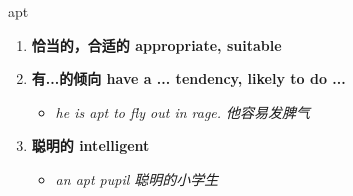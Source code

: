 
\begin{frame}
{\huge apt}
\begin{center}
\begin{enumerate}\Large
  \item \textbf{恰当的，合适的 appropriate, suitable}
  \item \textbf{有...的倾向 have a ... tendency, likely to do ...}
  \begin{itemize}
    \item \em{\Large{he is apt to fly out in rage. 他容易发脾气}}
  \end{itemize}
  \item \textbf{聪明的 intelligent}
  \begin{itemize}
    \item \em{\Large{an apt pupil 聪明的小学生}}
  \end{itemize}
\end{enumerate}
\end{center}
\end{frame}
